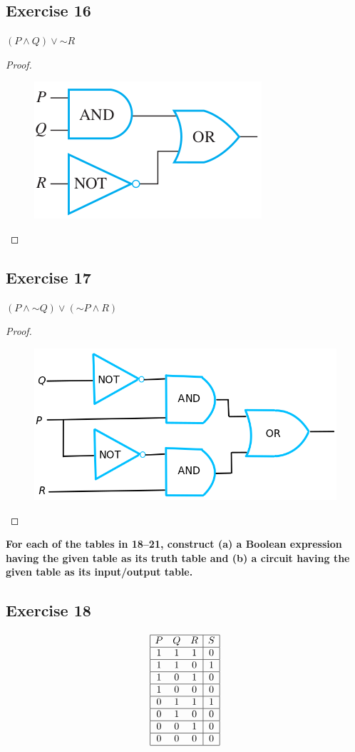 \documentclass[14pt]{extarticle}
\begin{document}
\subsection{Exercise 16} $(P \wedge Q) \vee {\sim R}$
\begin{proof} \begin{figure}[ht!] \centering
\includegraphics[scale=0.5]{../images/2.4.16.png} \end{figure} \end{proof}

\subsection{Exercise 17} $(P \wedge {\sim Q}) \vee ({\sim P} \wedge R)$
\begin{proof} \begin{figure}[ht!] \centering
\includegraphics[scale=0.3]{../images/2.4.17.png} \end{figure} \end{proof}

{\bf \color{cyan} For each of the tables in 18–21, construct (a) a Boolean
expression having the given table as its truth table and (b) a circuit having
the given table as its input/output table.}

\subsection{Exercise 18} $$ \begin{array}{|ccc|c|} \hline P&Q&R&S\\ \hline
1&1&1&0\\ \hline 1&1&0&1\\ \hline 1&0&1&0\\ \hline 1&0&0&0\\ \hline 0&1&1&1\\
\hline 0&1&0&0\\ \hline 0&0&1&0\\ \hline 0&0&0&0\\ \hline \end{array} $$
\end{document}
